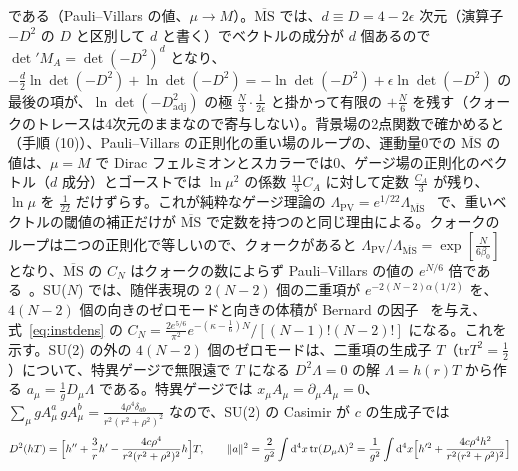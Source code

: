 \documentclass[a4paper,10pt]{ltjsarticle}
\newcommand{\dd}{\mathrm{d}}
\newcommand{\MSbar}{\overline{\mathrm{MS}}}
\newcommand{\tr}{\mathrm{tr}}
\begin{document}
である（Pauli--Villars の値、$\mu\to M$）。$\MSbar$ では、$d\equiv D=4-2\epsilon$ 次元（演算子 $-D^2$ の $D$ と区別して $d$ と書く）でベクトルの成分が $d$ 個あるので $\det'M_A=\det(-D^2)^d$ となり、$-\frac d2\ln\det(-D^2)+\ln\det(-D^2)=-\ln\det(-D^2)+\epsilon\ln\det(-D^2)$ の最後の項が、$\ln\det(-D^2_{\mathrm{adj}})$ の極 $\frac N3\cdot\frac1{2\epsilon}$ と掛かって有限の $+\frac N6$ を残す（クォークのトレースは4次元のままなので寄与しない）。背景場の2点関数で確かめると（手順 (10)）、Pauli--Villars の正則化の重い場のループの、運動量0での $\MSbar$ の値は、$\mu=M$ で Dirac フェルミオンとスカラーでは0、ゲージ場の正則化のベクトル（$d$ 成分）とゴーストでは $\ln\mu^2$ の係数 $\frac{11}3C_A$ に対して定数 $\frac{C_A}3$ が残り、$\ln\mu$ を $\frac1{22}$ だけずらす。これが純粋なゲージ理論の $\Lambda_{\mathrm{PV}}=e^{1/22}\Lambda_{\MSbar}$~\cite{hh81} で、重いベクトルの閾値の補正だけが $\MSbar$ で定数を持つのと同じ理由による。クォークのループは二つの正則化で等しいので、クォークがあると $\Lambda_{\mathrm{PV}}/\Lambda_{\MSbar}=\exp[\frac N{6\beta_0}]$ となり、$\MSbar$ の $C_N$ はクォークの数によらず Pauli--Villars の値の $e^{N/6}$ 倍である~\cite{thooft86,np94}。SU($N$) では、随伴表現の $2(N-2)$ 個の二重項が $e^{-2(N-2)\alpha(1/2)}$ を、$4(N-2)$ 個の向きのゼロモードと向きの体積が Bernard の因子~\cite{bernard79} を与え、式~\eqref{eq:instdens} の $C_N=\frac{2e^{5/6}}{\pi^2}e^{-(\kappa-\frac16)N}/[(N-1)!(N-2)!]$ になる。これを示す。SU(2) の外の $4(N-2)$ 個のゼロモードは、二重項の生成子 $T$（$\tr T^2=\frac12$）について、特異ゲージで無限遠で $T$ になる $D^2\Lambda=0$ の解 $\Lambda=h(r)T$ から作る $a_\mu=\frac1gD_\mu\Lambda$ である。特異ゲージでは $x_\mu A_\mu=\partial_\mu A_\mu=0$、$\sum_\mu gA^a_\mu\,gA^b_\mu=\frac{4\rho^4\delta_{ab}}{r^2(r^2+\rho^2)^2}$ なので、SU(2) の Casimir が $c$ の生成子では
\begin{equation*}
D^2(hT)=\Bigl[h''+\frac3rh'-\frac{4c\rho^4}{r^2(r^2+\rho^2)^2}h\Bigr]T,\qquad \|a\|^2=\frac2{g^2}\int\dd^4x\,\tr(D_\mu\Lambda)^2=\frac1{g^2}\int\dd^4x\Bigl[h'^2+\frac{4c\rho^4h^2}{r^2(r^2+\rho^2)^2}\Bigr]
\end{equation*}
\end{document}

